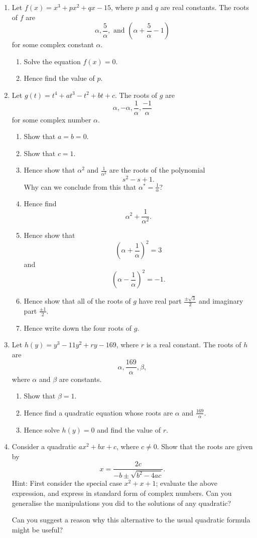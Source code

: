\documentclass{article}
\begin{document}
\begin{enumerate}
	\item Let $f(x)=x^3+px^2+qx-15$, where $p$ and $q$ are real constants. The roots of $f$ are
		\[\alpha, \frac{5}{\alpha},\mbox{ and } \left(\alpha+\frac{5}{\alpha}-1\right)\]
		for some complex constant $\alpha$.
		\begin{enumerate}
			\item Solve the equation $f(x)=0$.
			\item Hence find the value of $p$.
		\end{enumerate}
	\item Let $g(t)=t^4+at^3-t^2+bt+c$. The roots of $g$ are
		\[\alpha, -\alpha, \frac{1}{\alpha}, \frac{-1}{\alpha} \]
		for some complex number $\alpha$.
		\begin{enumerate}
			\item Show that $a=b=0$.
			\item Show that $c=1$.
			\item Hence show that $\alpha^2$ and $\frac{1}{\alpha^2}$ are the roots of the polynomial
				\[s^2-s+1.\]
				Why can we conclude from this that $\alpha^*=\frac{1}{\alpha}$?
			\item Hence find
				\[\alpha^2+\frac{1}{\alpha^2}.\]
			\item Hence show that
				\[\left(\alpha+\frac{1}{\alpha}\right)^2=3\]
				and
				\[\left(\alpha- \frac{1}{\alpha}\right)^2=-1.\]
			\item Hence show that all of the roots of $g$ have real part $\frac{\pm\sqrt{3}}{2}$ and imaginary part $\frac{\pm 1}{2}$.
			\item Hence write down the four roots of $g$.
		\end{enumerate}
	\item Let $h(y)=y^3-11y^2+ry-169$, where $r$ is a real constant. The roots of $h$ are
		\[\alpha, \frac{169}{\alpha},\beta,\]
		where $\alpha$ and $\beta$ are constants.
		\begin{enumerate}
			\item Show that $\beta=1$.
			\item Hence find a quadratic equation whose roots are $\alpha$ and $\frac{169}{\alpha}$.
			\item Hence solve $h(y)=0$ and find the value of $r$.
		\end{enumerate}
	\item Consider a quadratic $ax^2+bx+c$, where $c\neq 0$. Show that the roots are given by
		\[x=\frac{2c}{-b\pm\sqrt{b^2-4ac}}.\]
		Hint: First consider the special case $x^2+x+1$; evaluate the above expression, and express in standard form of complex numbers. Can you generalise the manipulations you did to the solutions of any quadratic?
		
		Can you suggest a reason why this alternative to the usual quadratic formula might be useful?
\end{enumerate}
\end{document}
